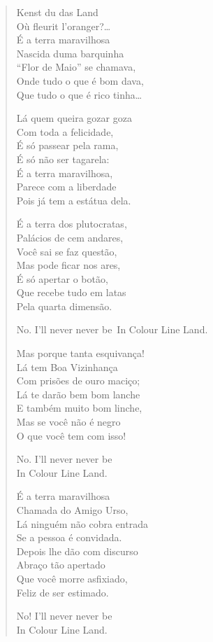 \begin{verse}
Kenst du das Land\\
Où fleurit l'oranger?\ldots{}\\
É a terra maravilhosa\\
Nascida duma barquinha\\
``Flor de Maio'' se chamava,\\
Onde tudo o que é bom dava,\\
Que tudo o que é rico tinha\ldots{}

Lá quem queira gozar goza\\
Com toda a felicidade,\\
É só passear pela rama,\\
É só não ser tagarela:\\
É a terra maravilhosa,\\
Parece com a liberdade\\
Pois já tem a estátua dela.

É a terra dos plutocratas,\\
Palácios de cem andares,\\
Você sai se faz questão,\\
Mas pode ficar nos ares,\\
É só apertar o botão,\\
Que recebe tudo em latas\\
Pela quarta dimensão.

\qquad No. I'll never never be\
\qquad In Colour Line Land.

Mas porque tanta esquivança!\\
Lá tem Boa Vizinhança\\
Com prisões de ouro maciço;\\
Lá te darão bem bom lanche\\
E também muito bom linche,\\
Mas se você não é negro\\
O que você tem com isso!

\qquad No. I'll never never be\\
\qquad In Colour Line Land.

É a terra maravilhosa\\
Chamada do Amigo Urso,\\
Lá ninguém não cobra entrada\\
Se a pessoa é convidada.\\
Depois lhe dão com discurso\\
Abraço tão apertado\\
Que você morre asfixiado,\\
Feliz de ser estimado.

\qquad No! I'll never never be\\
\qquad In Colour Line Land.
\end{verse}


